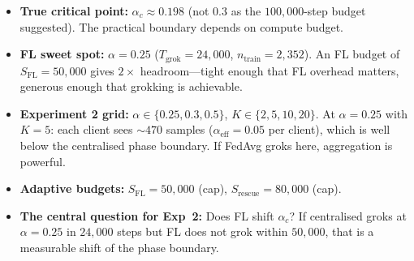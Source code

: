 \documentclass[11pt]{article}
\begin{document}
\begin{itemize}[nosep]
  \item \textbf{True critical point:} $\alpha_c \approx 0.198$ (not $0.3$ as the
        $100{,}000$-step budget suggested). The practical boundary depends on
        compute budget.
  \item \textbf{FL sweet spot:} $\alpha = 0.25$ ($T_{\text{grok}} = 24{,}000$,
        $n_{\text{train}} = 2{,}352$). An FL budget of $S_{\text{FL}} = 50{,}000$
        gives $2\times$ headroom---tight enough that FL overhead matters, generous
        enough that grokking is achievable.
  \item \textbf{Experiment 2 grid:} $\alpha \in \{0.25, 0.3, 0.5\}$, \;
        $K \in \{2, 5, 10, 20\}$.
        At $\alpha = 0.25$ with $K = 5$: each client sees $\sim 470$ samples
        ($\alpha_{\text{eff}} = 0.05$ per client), which is well below the
        centralised phase boundary. If FedAvg groks here, aggregation is powerful.
  \item \textbf{Adaptive budgets:}
        $S_{\text{FL}} = 50{,}000$ (cap),
        $S_{\text{rescue}} = 80{,}000$ (cap).
  \item \textbf{The central question for Exp~2:} Does FL shift $\alpha_c$? If
        centralised groks at $\alpha = 0.25$ in $24{,}000$ steps but FL does not
        grok within $50{,}000$, that is a measurable shift of the phase boundary.
\end{itemize}
\end{document}
